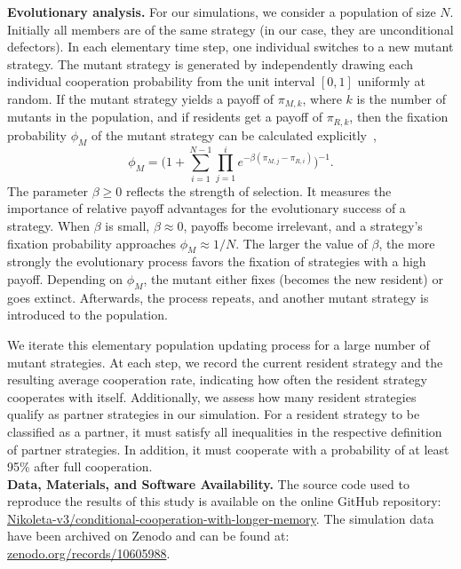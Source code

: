 \documentclass[9pt,twocolumn,twoside]{pnas-new}
\begin{document}
\noindent
{\bf Evolutionary analysis.} 
For our simulations, we consider a population of size \(N\). 
Initially all members are of the same strategy (in our case, they are unconditional defectors). 
In each elementary time step, one individual switches to a new mutant strategy. 
The mutant strategy is generated by independently drawing each individual cooperation probability from the unit interval \([0,1]\) uniformly at random. 
If the mutant strategy yields a payoff of \(\pi_{M, k}\), where \(k\) is the number of
mutants in the population, and if residents get a payoff of \(\pi_{R,
k}\), then the fixation probability \(\phi_{M}\) of the mutant strategy can be
calculated explicitly~\citep{nowak:Nature:2004},
\begin{equation}\label{eq:fixation_probability}
  \phi_{M} =\Big(1 + \displaystyle \sum_{i=1}^{N - 1} \prod_{j=1}^{i} e^{- \beta (\pi_{M, j} - \pi_{R, i})} \Big)^{-1}.
\end{equation}
The parameter \(\beta \geq 0\) reflects the strength of selection. 
It measures the importance of relative payoff advantages for the evolutionary success of a strategy. 
When \(\beta\) is small, \(\beta \approx 0\), payoffs become irrelevant, and a strategy's fixation probability approaches
\(\phi_{M} \approx 1 / N\). 
The larger the value of \(\beta\), the more strongly the evolutionary process favors the fixation of strategies with a high
payoff.
Depending on \(\phi_{M}\), the mutant either fixes (becomes the new resident) or goes extinct. 
Afterwards, the process repeats, and another mutant strategy is introduced to the population. 

We iterate this elementary population updating process for a large number of
mutant strategies. At each step, we record the current resident
strategy and the resulting average cooperation rate, indicating how often the
resident strategy cooperates with itself. Additionally, we assess how many
resident strategies qualify as partner strategies in our simulation. For a
resident strategy to be classified as a partner, it must satisfy all
inequalities in the respective definition of partner strategies. 
In addition, it must cooperate with a probability of at least 95\% after full cooperation.\\

\noindent
{\bf Data, Materials, and Software Availability.} The source code used to
reproduce the results of this study is available on the online GitHub
repository:
\href{https://github.com/Nikoleta-v3/conditional-cooperation-with-longer-memory}{Nikoleta-v3/conditional-cooperation-with-longer-memory}.
The simulation data have been archived on Zenodo and can be found at:
\href{https://zenodo.org/records/10605988}{zenodo.org/records/10605988}.
\end{document}
